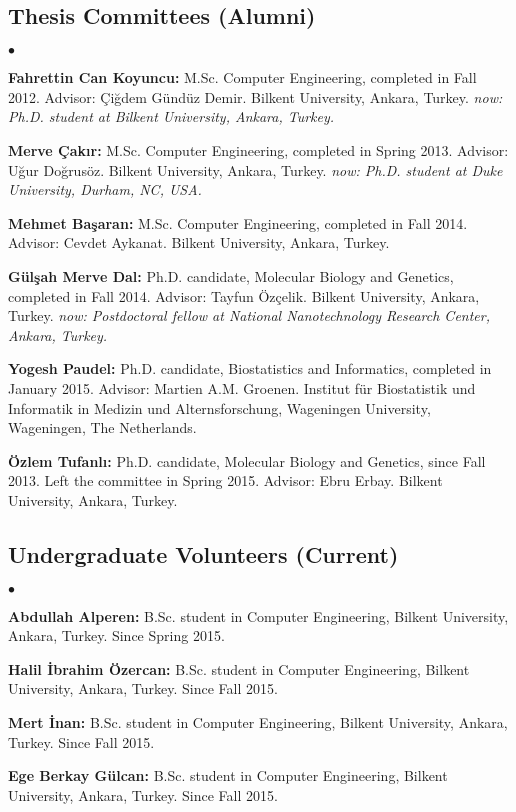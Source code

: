 \documentclass[margin,line]{res}
\newenvironment{list2}{
  \begin{list}{$\bullet$}{%
      \setlength{\itemsep}{0in}
      \setlength{\parsep}{0in} \setlength{\parskip}{0in}
      \setlength{\topsep}{0in} \setlength{\partopsep}{0in} 
      \setlength{\leftmargin}{0.2in}}}{\end{list}}
\begin{document}
\begin{resume}
\vspace*{-.6cm}
\subsection{\small \sc Thesis Committees (Alumni)}
\begin{list2}
\item
  {\bf Fahrettin Can Koyuncu:} M.Sc. Computer Engineering, completed in Fall 2012. Advisor: Çiğdem Gündüz Demir.
  Bilkent University, Ankara, Turkey. {\it now: Ph.D. student at Bilkent University, Ankara, Turkey.}
\item
  {\bf Merve Çakır:} M.Sc. Computer Engineering, completed in Spring 2013. Advisor: Uğur Doğrusöz.
  Bilkent University, Ankara, Turkey. {\it now: Ph.D. student at Duke University, Durham, NC, USA.}
\item
  {\bf Mehmet Başaran:} M.Sc. Computer Engineering, completed in Fall 2014. Advisor: Cevdet Aykanat.
  Bilkent University, Ankara, Turkey. %
\item
  {\bf G\"{u}l\c{s}ah Merve Dal:} Ph.D. candidate, Molecular Biology and Genetics, completed in Fall 2014.
  Advisor: Tayfun Özçelik.
  Bilkent University, Ankara, Turkey. {\it now: Postdoctoral fellow at National Nanotechnology Research Center, Ankara, Turkey.}
\item
  {\bf Yogesh Paudel:} Ph.D. candidate, Biostatistics and Informatics, completed in January 2015.
  Advisor: Martien A.M. Groenen.
  Institut für Biostatistik und Informatik in Medizin und Alternsforschung,  Wageningen University, Wageningen, The Netherlands.
\item
  {\bf Özlem Tufanlı:} Ph.D. candidate, Molecular Biology and Genetics, since Fall 2013. Left the committee in Spring 2015.
  Advisor: Ebru Erbay.
  Bilkent University, Ankara, Turkey.
  \end{list2}

  \vspace*{-.6cm}
  \subsection{\small \sc Undergraduate Volunteers (Current)}
  \begin{list2}
    \item 
      {\bf Abdullah Alperen:} B.Sc. student in Computer Engineering,  Bilkent University, Ankara, Turkey. Since Spring 2015. 
    \item 
      {\bf Halil İbrahim Özercan:} B.Sc. student in Computer Engineering,  Bilkent University, Ankara, Turkey. Since Fall 2015. 
    \item 
      {\bf Mert İnan:} B.Sc. student in Computer Engineering,  Bilkent University, Ankara, Turkey. Since Fall 2015. 
    \item 
      {\bf Ege Berkay Gülcan:} B.Sc. student in Computer Engineering,  Bilkent University, Ankara, Turkey. Since Fall 2015. 
  \end{list2}


\end{resume}
\end{document}
